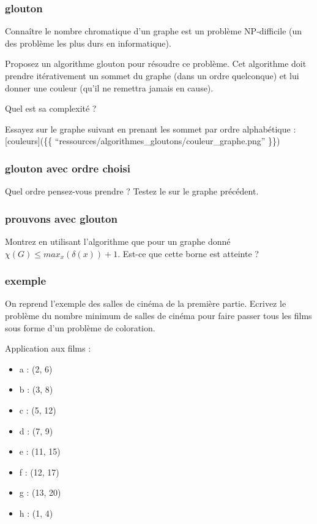 \documentclass[
]{article}
\providecommand{\tightlist}{%
  \setlength{\itemsep}{0pt}\setlength{\parskip}{0pt}}
\begin{document}
\hypertarget{glouton}{%
\subsubsection{glouton}\label{glouton}}

Connaître le nombre chromatique d'un graphe est un problème NP-difficile
(un des problème les plus durs en informatique).

Proposez un algorithme glouton pour résoudre ce problème. Cet algorithme
doit prendre itérativement un sommet du graphe (dans un ordre
quelconque) et lui donner une couleur (qu'il ne remettra jamais en
cause).

Quel est sa complexité ?

Essayez sur le graphe suivant en prenant les sommet par ordre
alphabétique : {[}couleurs{]}(\{\{
``ressources/algorithmes\_gloutons/couleur\_graphe.png'' \}\})

\hypertarget{glouton-avec-ordre-choisi}{%
\subsubsection{glouton avec ordre
choisi}\label{glouton-avec-ordre-choisi}}

Quel ordre pensez-vous prendre ? Testez le sur le graphe précédent.

\hypertarget{prouvons-avec-glouton}{%
\subsubsection{prouvons avec glouton}\label{prouvons-avec-glouton}}

Montrez en utilisant l'algorithme que pour un graphe donné
\(\chi(G) \leq max_x(\delta(x)) +1\). Est-ce que cette borne est
atteinte ?

\hypertarget{exemple}{%
\subsubsection{exemple}\label{exemple}}

On reprend l'exemple des salles de cinéma de la première partie. Ecrivez
le problème du nombre minimum de salles de cinéma pour faire passer tous
les films sous forme d'un problème de coloration.

Application aux films :

\begin{itemize}
\tightlist
\item
  a : (2, 6)
\item
  b : (3, 8)
\item
  c : (5, 12)
\item
  d : (7, 9)
\item
  e : (11, 15)
\item
  f : (12, 17)
\item
  g : (13, 20)
\item
  h : (1, 4)
\end{itemize}
\end{document}
